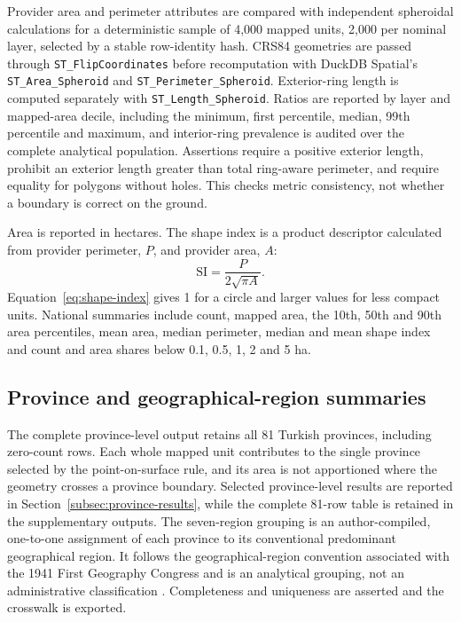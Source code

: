 \documentclass[pdflatex,sn-basic]{sn-jnl}
\begin{document}
Provider area and perimeter attributes are compared with independent spheroidal calculations for a deterministic sample of 4,000 mapped units, 2,000 per nominal layer, selected by a stable row-identity hash. CRS84 geometries are passed through \texttt{ST\_FlipCoordinates} before recomputation with DuckDB Spatial's \texttt{ST\_Area\_Spheroid} and \texttt{ST\_Perimeter\_Spheroid}. Exterior-ring length is computed separately with \texttt{ST\_Length\_Spheroid}. Ratios are reported by layer and mapped-area decile, including the minimum, first percentile, median, 99th percentile and maximum, and interior-ring prevalence is audited over the complete analytical population. Assertions require a positive exterior length, prohibit an exterior length greater than total ring-aware perimeter, and require equality for polygons without holes. This checks metric consistency, not whether a boundary is correct on the ground.

Area is reported in hectares. The shape index is a product descriptor calculated from provider perimeter, $P$, and provider area, $A$:
\begin{equation}
\mathrm{SI}=\frac{P}{2\sqrt{\pi A}}.
\label{eq:shape-index}
\end{equation}
Equation~\ref{eq:shape-index} gives 1 for a circle and larger values for less compact units. National summaries include count, mapped area, the 10th, 50th and 90th area percentiles, mean area, median perimeter, median and mean shape index and count and area shares below 0.1, 0.5, 1, 2 and 5 ha.

\subsection{Province and geographical-region summaries}\label{subsec:province}

The complete province-level output retains all 81 Turkish provinces, including zero-count rows. Each whole mapped unit contributes to the single province selected by the point-on-surface rule, and its area is not apportioned where the geometry crosses a province boundary. Selected province-level results are reported in Section~\ref{subsec:province-results}, while the complete 81-row table is retained in the supplementary outputs. The seven-region grouping is an author-compiled, one-to-one assignment of each province to its conventional predominant geographical region. It follows the geographical-region convention associated with the 1941 First Geography Congress and is an analytical grouping, not an administrative classification \citep{yaylali_bolgesel_2021}. Completeness and uniqueness are asserted and the crosswalk is exported.
\end{document}
